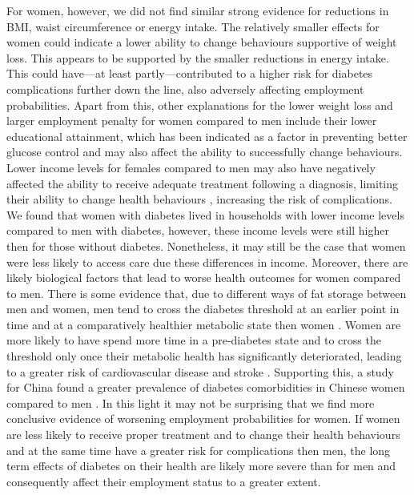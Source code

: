 For women, however, we did not find similar strong evidence for reductions in \ac{BMI}, waist circumference or energy intake. The relatively smaller effects for women could indicate a lower ability to change behaviours supportive of weight loss. This appears to be supported by the smaller reductions in energy intake. This could have---at least partly---contributed to a higher risk for diabetes complications further down the line, also adversely affecting employment probabilities. Apart from this, other explanations for the lower weight loss and larger employment penalty for women compared to men include their lower educational attainment, which has been indicated as a factor in preventing better glucose control \autocite{Luo2015} and may also affect the ability to successfully change behaviours. Lower income levels for females compared to men may also have negatively affected the ability to receive adequate treatment following a diagnosis, limiting their ability to change health behaviours \autocite{Luo2015}, increasing the risk of complications. We found that women with diabetes lived in households with lower income levels compared to men with diabetes, however, these income levels were still higher then for those without diabetes. Nonetheless, it may still be the case that women were less likely to access care due these differences in income. Moreover, there are likely biological factors that lead to worse health outcomes for women compared to men. There is some evidence that, due to different ways of fat storage between men and women, men tend to cross the diabetes threshold at an earlier point in time and at a comparatively healthier metabolic state then women \parencite{Peters2015,Peters2014a,Peters2014}. Women are more likely to have spend more time in a pre-diabetes state \parencite{Bertram2010} and to cross the threshold only once their metabolic health has significantly deteriorated, leading to a greater risk of cardiovascular disease and stroke \parencite{Peters2015}. Supporting this, a study for China found a greater prevalence of diabetes comorbidities in Chinese women compared to men \autocite{Liu2010}. In this light it may not be surprising that we find more conclusive evidence of worsening employment probabilities for women. If women are less likely to receive proper treatment and to change their health behaviours and at the same time have a greater risk for complications then men, the long term effects of diabetes on their health are likely more severe than for men and consequently affect their employment status to a greater extent.

